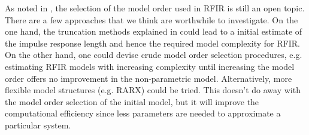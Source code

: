 As noted in , the selection of the model order used in \gls{RFIR} is still an open topic.
There are a few approaches that we think are worthwhile to investigate.
On the one hand, the truncation methods explained in  could lead to a initial estimate of the impulse response length and hence the required model complexity for \gls{RFIR}.
On the other hand, one could devise crude model order selection procedures, e.g.  estimating \gls{RFIR} models with increasing complexity until increasing the model order offers no improvement in the non-parametric model.
Alternatively, more flexible model structures (e.g. \gls{RARX}) could be tried.
This doesn't do away with the model order selection of the initial model, but it will improve the computational efficiency since less parameters are needed to approximate a particular system.

  

